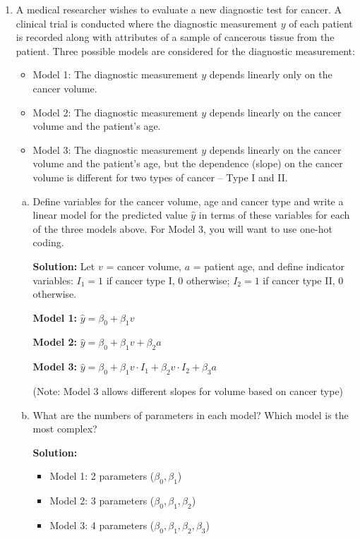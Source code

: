 \documentclass[11pt]{article}
\begin{document}
\begin{enumerate}
\item A medical researcher wishes to evaluate a new diagnostic test for cancer.
A clinical trial is conducted where the diagnostic measurement $y$ of each patient is recorded along with
attributes of a sample of cancerous tissue from the patient.
Three possible models are considered for the diagnostic measurement:
\begin{itemize}
\item Model 1:  The diagnostic measurement $y$ depends linearly only on the cancer volume.
\item Model 2:  The diagnostic measurement $y$ depends linearly on the cancer volume and the patient's age.
\item Model 3:  The diagnostic measurement $y$ depends linearly on the cancer volume and the patient's age,
but the dependence (slope) on the cancer volume is different for two types of cancer -- Type I and II.
\end{itemize}


\begin{enumerate}[(a)]
  \item Define variables  for the cancer volume, age and cancer type and write a linear model
  for the predicted value $\hat{y}$ in terms of these variables for each of the three models above.
  For Model 3, you will want to use one-hot coding.

  \textbf{Solution:}
  Let $v$ = cancer volume, $a$ = patient age, and define indicator variables:
  $I_1 = 1$ if cancer type I, 0 otherwise; $I_2 = 1$ if cancer type II, 0 otherwise.
  
  \textbf{Model 1:} $\hat{y} = \beta_0 + \beta_1 v$
  
  \textbf{Model 2:} $\hat{y} = \beta_0 + \beta_1 v + \beta_2 a$
  
  \textbf{Model 3:} $\hat{y} = \beta_0 + \beta_1 v \cdot I_1 + \beta_2 v \cdot I_2 + \beta_3 a$
  
  (Note: Model 3 allows different slopes for volume based on cancer type)

  \item What are the numbers of parameters in each model?  Which model is the most complex?

  \textbf{Solution:}
  \begin{itemize}
    \item Model 1: 2 parameters ($\beta_0, \beta_1$)
    \item Model 2: 3 parameters ($\beta_0, \beta_1, \beta_2$)
    \item Model 3: 4 parameters ($\beta_0, \beta_1, \beta_2, \beta_3$)
  \end{itemize}
  

\end{enumerate}
\end{enumerate}
\end{document}
